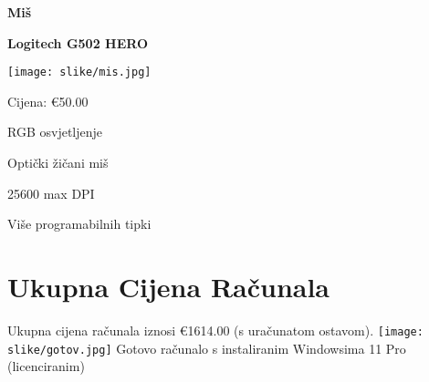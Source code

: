 \documentclass{article}
\begin{document}
\newpage


\large\textbf{Miš}

\textbf{Logitech G502 HERO}\par
   \texttt{[image: slike/mis.jpg]}\par
Cijena: €50.00\par
RGB osvjetljenje\par
Optički žičani miš\par
25600 max DPI\par
Više programabilnih tipki\par


\newpage


\section{Ukupna Cijena Računala}

Ukupna cijena računala iznosi €1614.00 (s uračunatom ostavom).
    \centering
   \texttt{[image: slike/gotov.jpg]}
Gotovo računalo s instaliranim Windowsima 11 Pro (licenciranim)
\end{document}
